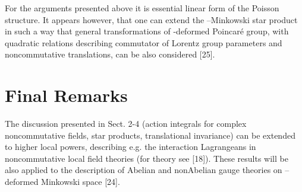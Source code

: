 \documentclass[a4paper,a4paper]{article}
\begin{document}

For the arguments presented above it is essential linear form of
the Poisson structure.
It appears however, that one can extend the \myHighlight{$\kappa$}\coordHE{}--Minkowski
star product in such a way that general transformations of
\myHighlight{$\kappa$}\coordHE{}-deformed Poincar\'{e} group, with quadratic relations
describing commutator of Lorentz group parameters and
noncommutative translations, can be also considered [25].

\section{Final Remarks}

The discussion presented in Sect. 2-4 (action integrals for
complex noncommutative fields, star products, translational
invariance) can be extended to higher local powers, describing
e.g. the interaction Lagrangeans in noncommutative local field
theories  (for \coordHE{} theory see [18]). These
results will be also applied to the description of Abelian and 
nonAbelian
 gauge  theories on \myHighlight{$\kappa$}\coordHE{}--deformed Minkowski space [24].
\end{document}
